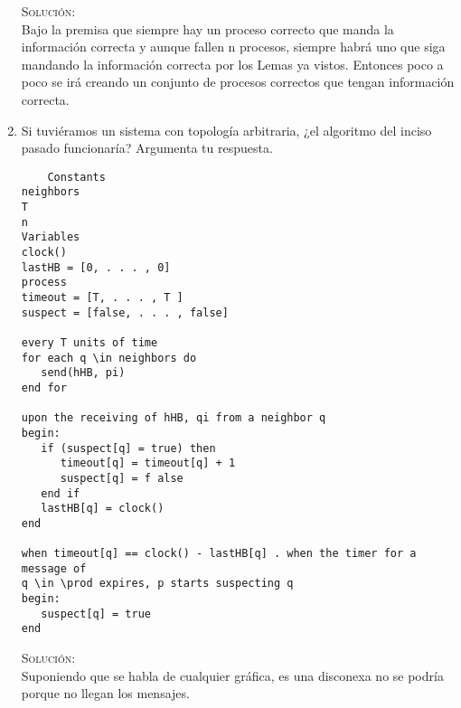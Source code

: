 \documentclass[letterpaper,10pt]{article}
\begin{document}
\begin{enumerate}
   
    \textsc{Solución:}
    \\	
	Bajo la premisa  que siempre hay un proceso correcto que manda la información correcta y aunque fallen n procesos, siempre habrá uno que siga mandando la información correcta por los Lemas ya vistos.
	Entonces poco a poco se irá creando un conjunto de procesos correctos que tengan información correcta.\\
    
    \item Si tuviéramos un sistema con topología arbitraria, ¿el algoritmo del inciso pasado funcionaría? Argumenta tu respuesta.\\
    \begin{lstlisting}
    Constants
neighbors
T
n
Variables
clock()
lastHB = [0, . . . , 0]
process
timeout = [T, . . . , T ]
suspect = [false, . . . , false]

every T units of time
for each q \in neighbors do
   send(hHB, pi)
end for

upon the receiving of hHB, qi from a neighbor q
begin:
   if (suspect[q] = true) then
      timeout[q] = timeout[q] + 1
      suspect[q] = f alse
   end if
   lastHB[q] = clock()
end

when timeout[q] == clock() - lastHB[q] . when the timer for a message of
q \in \prod expires, p starts suspecting q
begin:
   suspect[q] = true
end
    \end{lstlisting}
    
    \textsc{Solución:}
    \\
    Suponiendo que se habla de cualquier gráfica, es una disconexa no se podría porque no llegan los mensajes.
    
	 
	\end{enumerate} 
\end{document}
